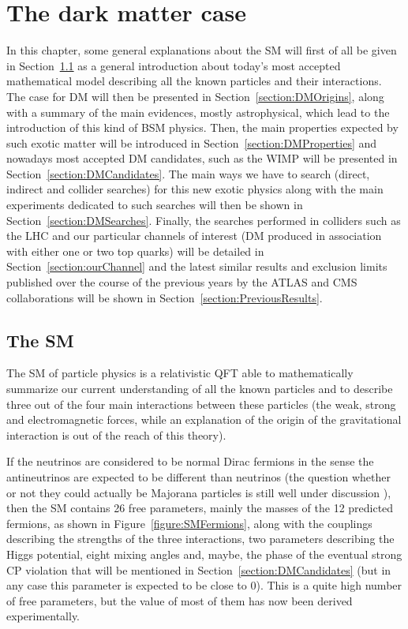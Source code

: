 \documentclass[a4paper, 10pt, openright]{report}
\begin{document}
\chapter{The dark matter case}\label{chapter:Case}

In this chapter, some general explanations about the \ac{SM} will first of all be given in Section~\ref{section:SM} as a general introduction about today's most accepted mathematical model describing all the known particles and their interactions. The case for \ac{DM} will then be presented in Section~\ref{section:DMOrigins}, along with a summary of the main evidences, mostly astrophysical, which lead to the introduction of this kind of \acf{BSM} physics. Then, the main properties expected by such exotic matter will be introduced in Section~\ref{section:DMProperties} and nowadays most accepted \ac{DM} candidates, such as the \acf{WIMP} will be presented in Section~\ref{section:DMCandidates}. The main ways we have to search (direct, indirect and collider searches) for this new exotic physics along with the main experiments dedicated to such searches will then be shown in Section~\ref{section:DMSearches}. Finally, the searches performed in colliders such as the \ac{LHC} and our particular channels of interest (\ac{DM} produced in association with either one or two top quarks) will be detailed in Section~\ref{section:ourChannel} and the latest similar results and exclusion limits published over the course of the previous years by the \ac{ATLAS} and \ac{CMS} collaborations will be shown in Section~\ref{section:PreviousResults}.

\section{The \acf{SM}} \label{section:SM}

The \ac{SM} of particle physics is a relativistic \ac{QFT} able to  mathematically summarize our current understanding of all the known particles and to describe three out of the four main interactions between these particles (the weak, strong and electromagnetic forces, while an explanation of the origin of the gravitational interaction is out of the reach of this theory). 

If the neutrinos are considered to be normal Dirac fermions in the sense the antineutrinos are expected to be different than neutrinos (the question whether or not they could actually be Majorana particles is still well under discussion \cite{Majorana}), then the \ac{SM} contains 26 free parameters, mainly the masses of the 12 predicted fermions, as shown in Figure~\ref{figure:SMFermions}, along with the couplings describing the strengths of the three interactions, two parameters describing the Higgs potential, eight mixing angles and, maybe, the phase of the eventual strong CP violation that will be mentioned in Section~\ref{section:DMCandidates} (but in any case this parameter is expected to be close to 0). This is a quite high number of free parameters, but the value of most of them has now been derived experimentally.
\end{document}
